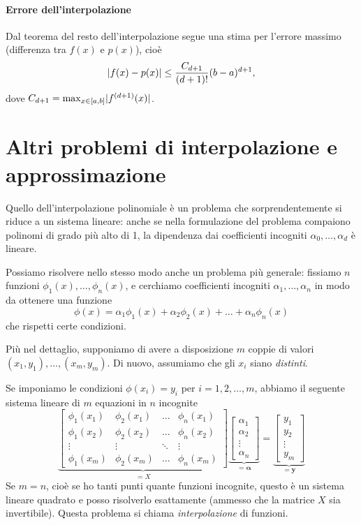 \documentclass[a4paper]{report}
\DeclarePairedDelimiter{\abs}{\lvert}{\rvert}
\theoremstyle{definiton}
\theoremstyle{remark}
\begin{document}
\paragraph{Errore dell'interpolazione} Dal teorema del resto dell'interpolazione segue una stima per l'errore massimo (differenza tra $f(x)$ e $p(x)$), cioè
\[
\abs{f(x) - p(x)} \leq \frac{C_{d+1}}{(d+1)!}(b-a)^{d+1},
\]
dove $C_{d+1} = \max_{x\in [a,b]} \abs{f^{(d+1)}(x)}$.


\section{Altri problemi di interpolazione e approssimazione}
Quello dell'interpolazione polinomiale è un problema che sorprendentemente si riduce a un sistema lineare: anche se nella formulazione del problema compaiono polinomi di grado più alto di 1, la dipendenza dai coefficienti incogniti $\alpha_0,\dots, \alpha_d$ è lineare. 

Possiamo risolvere nello stesso modo anche un problema più generale: fissiamo $n$ funzioni $\phi_1(x), \dots, \phi_n(x)$, e cerchiamo coefficienti incogniti $\alpha_1,\dots,\alpha_n$ in modo da ottenere una funzione
\begin{equation} \label{phi}
    \phi(x) = \alpha_1 \phi_1(x) + \alpha_2 \phi_2(x) + \dots + \alpha_n \phi_n(x)    
\end{equation}
che rispetti certe condizioni.

Più nel dettaglio, supponiamo di avere a disposizione $m$ coppie di valori $(x_1,y_1), \dots, (x_m,y_m)$. Di nuovo, assumiamo che gli $x_i$ siano \emph{distinti}.

Se imponiamo le condizioni $\phi(x_i) = y_i$ per $i=1,2,\dots, m$, abbiamo il seguente sistema lineare di $m$ equazioni in $n$ incognite
\[
\underbrace{
\begin{bmatrix}
    \phi_1(x_1) & \phi_2(x_1) & \dots & \phi_n(x_1)\\
    \phi_1(x_2) & \phi_2(x_2) & \dots & \phi_n(x_2)\\
    \vdots & \vdots & \ddots & \vdots\\
    \phi_1(x_m) & \phi_2(x_m) & \dots & \phi_n(x_m)
\end{bmatrix}}_{=X}
\underbrace{\begin{bmatrix}
    \alpha_1\\ \alpha_2 \\ \vdots \\ \alpha_n
\end{bmatrix}
}_{=\mathbf{\alpha}}
= \underbrace{\begin{bmatrix}
    y_1\\ y_2 \\ \vdots \\ y_m
\end{bmatrix}}_{=\mathbf{y}}
\]
Se $m=n$, cioè se ho tanti punti quante funzioni incognite, questo è un sistema lineare quadrato e posso risolverlo esattamente (ammesso che la matrice $X$ sia invertibile). Questa problema si chiama \emph{interpolazione} di funzioni. 
\end{document}
